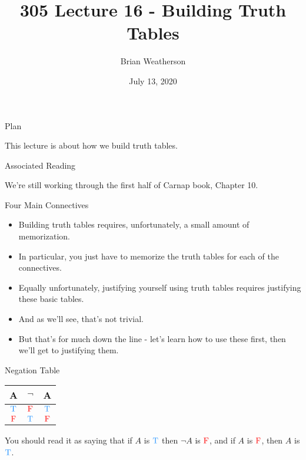 \documentclass[
  ignorenonframetext,
]{beamer}
\title{305 Lecture 16 - Building Truth Tables}
\author{Brian Weatherson}
\date{July 13, 2020}
\providecommand{\tightlist}{%
  \setlength{\itemsep}{0pt}\setlength{\parskip}{0pt}}
\renewcommand{\,}{\text{, }}
\def\True{\textcolor{dodgerblue}{\text{T}}}
\def\False{\textcolor{red}{\text{F}}}
\begin{document}
\frame{\titlepage}

\begin{frame}{Plan}
\protect\hypertarget{plan}{}

This lecture is about how we build truth tables.

\end{frame}

\begin{frame}{Associated Reading}
\protect\hypertarget{associated-reading}{}

We're still working through the first half of Carnap book, Chapter 10.

\end{frame}

\begin{frame}{Four Main Connectives}
\protect\hypertarget{four-main-connectives}{}

\begin{itemize}
\tightlist
\item
  Building truth tables requires, unfortunately, a small amount of
  memorization.
\item
  In particular, you just have to memorize the truth tables for each of
  the connectives.
\item
  Equally unfortunately, justifying yourself using truth tables requires
  justifying these basic tables.
\item
  And as we'll see, that's not trivial.
\item
  But that's for much down the line - let's learn how to use these
  first, then we'll get to justifying them.
\end{itemize}

\end{frame}

\begin{frame}{Negation Table}
\protect\hypertarget{negation-table}{}

\begin{center}
\begin{tabular}{@{ }c | c@{ }@{ }c}
A & $\neg$ & A\\
\hline 
$\True$ & \textcolor{red}{$\False$} & $\True$\\
$\False$ & \textcolor{red}{$\True$} & $\False$\\
\end{tabular}
\bigskip
\end{center}

You should read it as saying that if \(A\) is \(\True\) then \(\neg A\)
is \(\False\), and if \(A\) is \(\False\), then \(A\) is \(\True\).

\end{frame}
\end{document}
